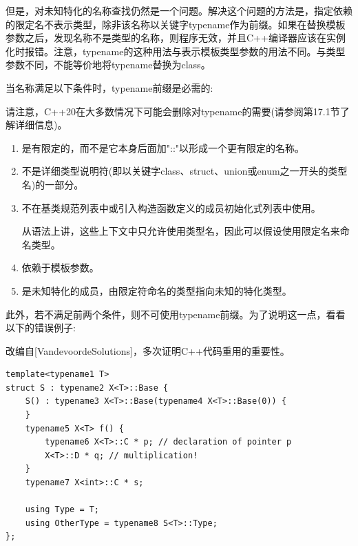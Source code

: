 但是，对未知特化的名称查找仍然是一个问题。解决这个问题的方法是，指定依赖的限定名不表示类型，除非该名称以关键字typename作为前缀。如果在替换模板参数之后，发现名称不是类型的名称，则程序无效，并且C++编译器应该在实例化时报错。注意，typename的这种用法与表示模板类型参数的用法不同。与类型参数不同，不能等价地将typename替换为class。

当名称满足以下条件时，typename前缀是必需的:

\begin{tcolorbox}[colback=webgreen!5!white,colframe=webgreen!75!black]
\hspace*{0.75cm}请注意，C++20在大多数情况下可能会删除对typename的需要(请参阅第17.1节了解详细信息)。
\end{tcolorbox}

\begin{enumerate}
\item 
是有限定的，而不是它本身后面加"::"以形成一个更有限定的名称。

\item 
不是详细类型说明符(即以关键字class、struct、union或enum之一开头的类型名)的一部分。

\item 
不在基类规范列表中或引入构造函数定义的成员初始化式列表中使用。

\begin{tcolorbox}[colback=webgreen!5!white,colframe=webgreen!75!black]
\hspace*{0.75cm}从语法上讲，这些上下文中只允许使用类型名，因此可以假设使用限定名来命名类型。
\end{tcolorbox}

\item 
依赖于模板参数。

\item 
是未知特化的成员，由限定符命名的类型指向未知的特化类型。
\end{enumerate}

此外，若不满足前两个条件，则不可使用typename前缀。为了说明这一点，看看以下的错误例子:

\begin{tcolorbox}[colback=webgreen!5!white,colframe=webgreen!75!black]
\hspace*{0.75cm}改编自[VandevoordeSolutions]，多次证明C++代码重用的重要性。
\end{tcolorbox}

\begin{lstlisting}[style=styleCXX]
template<typename1 T>
struct S : typename2 X<T>::Base {
	S() : typename3 X<T>::Base(typename4 X<T>::Base(0)) {
	}
	typename5 X<T> f() {
		typename6 X<T>::C * p; // declaration of pointer p
		X<T>::D * q; // multiplication!
	}
	typename7 X<int>::C * s;
	
	using Type = T;
	using OtherType = typename8 S<T>::Type;
};
\end{lstlisting}

